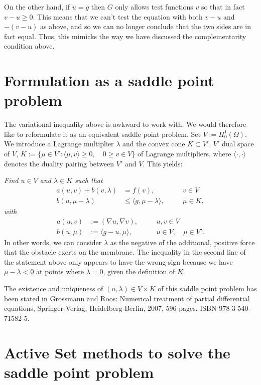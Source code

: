 \documentclass{article}
\begin{document}
On the other hand, if $u=g$ then $G$ only allows test functions $v$ so that in fact
$v-u\ge 0$. This means that we can't test the equation with both $v-u$ and
$-(v-u)$ as above, and so we can no longer conclude that the two sides are in
fact equal. Thus, this mimicks the way we have discussed the complementarity
condition above.



\section{Formulation as a saddle point problem}

The variational inequality above is awkward to work with. We would therefore
like to reformulate it as an equivalent saddle point problem. Set $V:=H^1_0(\Omega)$.
We introduce a Lagrange multiplier $\lambda$ and the convex cone $K\subset V'$, $V'$
dual space of $V$, $K:=\{\mu\in V': \langle\mu,v\rangle\geq 0,\quad 0\geq v\in V\}$ of
Lagrange multipliers, where $\langle\cdot,\cdot\rangle$ denotes the duality
pairing between $V'$ and $V$. This yields:

\textit{Find $u\in V$ and $\lambda\in K$ such that}
\begin{align*}
 a(u,v) + b(v,\lambda) &= f(v),\quad &&v\in V\\
 b(u,\mu - \lambda) &\leq \langle g,\mu - \lambda\rangle,\quad&&\mu\in K,
\end{align*}
\textit{with}
\begin{align*}
 a(u,v) &:= \left(\nabla u, \nabla v\right),\quad &&u,v\in V\\
 b(u,\mu) &:= \langle g-u,\mu\rangle,\quad &&u\in V,\quad\mu\in V'.
\end{align*}
In other words, we can consider $\lambda$ as the negative of the additional, positive force that the
obstacle exerts on the membrane. The inequality in the second line of the
statement above only appears to have the wrong sign because we have
$\mu-\lambda<0$ at points where $\lambda=0$, given the definition of $K$.

The existence and uniqueness of $(u,\lambda)\in V\times K$ of this saddle
point problem has been stated in Grossmann and Roos: Numerical treatment of
partial differential equations, Springer-Verlag, Heidelberg-Berlin, 2007, 596
pages, ISBN 978-3-540-71582-5.



\section{Active Set methods to solve the saddle point problem}
\end{document}
